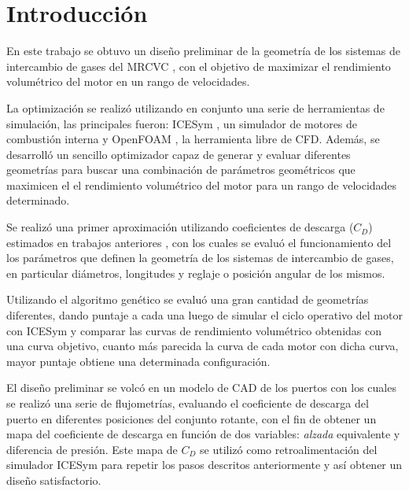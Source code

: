 \chapter{Introducción}

En este trabajo se obtuvo un diseño preliminar de la geometría de los  sistemas
de intercambio de gases del MRCVC \cite{toth}, con el objetivo de maximizar el
rendimiento volumétrico del motor en un rango de velocidades.

La optimización se realizó utilizando en conjunto una serie de herramientas de
simulación, las principales fueron: ICESym \cite{icesym}, un simulador de
motores de combustión interna y OpenFOAM \cite{openfoam}, la herramienta libre
de CFD.
%
Además, se desarrolló un sencillo optimizador capaz de generar y evaluar
diferentes geometrías para buscar una combinación de parámetros geométricos que
maximicen el el rendimiento volumétrico del motor para un rango de velocidades
determinado.

Se realizó una primer aproximación utilizando coeficientes de descarga ($C_{D}$)
estimados en trabajos anteriores \cite{lopez13}, con los cuales se evaluó el
funcionamiento del los parámetros que definen la geometría de los sistemas de
intercambio de gases, en particular diámetros, longitudes y reglaje o posición
angular de los mismos.

Utilizando el algoritmo genético se evaluó una gran cantidad de geometrías
diferentes, dando puntaje a cada una luego de simular el ciclo operativo del
motor con ICESym y comparar las curvas de rendimiento volumétrico obtenidas con
una curva objetivo, cuanto más parecida la curva de cada motor con dicha curva,
mayor puntaje obtiene una determinada configuración.


El diseño preliminar se volcó en un modelo de CAD de los puertos con los cuales
se realizó una serie de flujometrías, evaluando el coeficiente de descarga del
puerto en diferentes posiciones del conjunto rotante, con el fin de obtener un
mapa del coeficiente de descarga en función de dos variables: \emph{alzada}
equivalente y diferencia de presión.
%
Este mapa de $C_{D}$ se utilizó como retroalimentación del simulador ICESym
para repetir los pasos descritos anteriormente y así obtener un diseño
satisfactorio.

